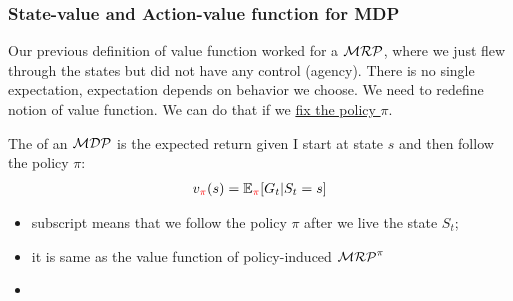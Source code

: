 
\subsubsection{State-value and Action-value function for MDP}
Our previous definition of value function worked for a $\mathcal{MRP}$, where we just flew through the states but did not have any control (agency). There is no single expectation, expectation depends on behavior we choose. We need to redefine notion of value function. We can do that if we \underline{fix the policy $\pi$}.

The  of an $\mathcal{MDP}$ is the expected return given I start at state $s$ and then follow the policy $\pi$:
\begin{align}
	v_{\textcolor{red}{\pi}}(s) = \operatorname{\mathbb{E}}_{\textcolor{red}{\pi}}[G_t | S_t = s]
\end{align}
\begin{itemize}
	\item subscript \red{$\pi$} means that we follow the policy $\pi$ after we live the state $S_t$;
	\item it is same as the value function of policy-induced $\mathcal{MRP}^{\pi}$
	\item {}
\end{itemize}

